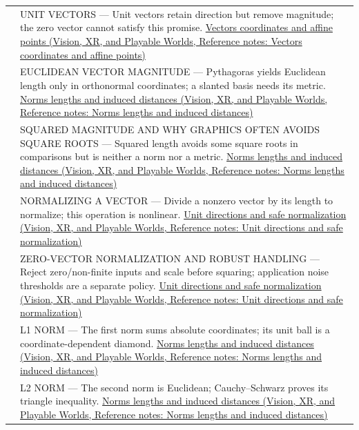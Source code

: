 {\begin{longtable}[]{@{}
  >{\raggedright\arraybackslash}p{}
  >{\raggedright\arraybackslash}p{}@{}}
525 & UNIT VECTORS --- Unit vectors retain direction but remove magnitude; the zero vector cannot satisfy this promise. \href{../07-Vision-XR-and-Playable-Worlds/main.pdf\#nameddest=appendix-0659864c0aa3}{Vectors coordinates and affine points (Vision, XR, and Playable Worlds, Reference notes: Vectors coordinates and affine points)} \\
526 & EUCLIDEAN VECTOR MAGNITUDE --- Pythagoras yields Euclidean length only in orthonormal coordinates; a slanted basis needs its metric. \href{../07-Vision-XR-and-Playable-Worlds/main.pdf\#nameddest=appendix-49933872bb51}{Norms lengths and induced distances (Vision, XR, and Playable Worlds, Reference notes: Norms lengths and induced distances)} \\
527 & SQUARED MAGNITUDE AND WHY GRAPHICS OFTEN AVOIDS SQUARE ROOTS --- Squared length avoids some square roots in comparisons but is neither a norm nor a metric. \href{../07-Vision-XR-and-Playable-Worlds/main.pdf\#nameddest=appendix-49933872bb51}{Norms lengths and induced distances (Vision, XR, and Playable Worlds, Reference notes: Norms lengths and induced distances)} \\
528 & NORMALIZING A VECTOR --- Divide a nonzero vector by its length to normalize; this operation is nonlinear. \href{../07-Vision-XR-and-Playable-Worlds/main.pdf\#nameddest=appendix-f744e41b95b4}{Unit directions and safe normalization (Vision, XR, and Playable Worlds, Reference notes: Unit directions and safe normalization)} \\
529 & ZERO-VECTOR NORMALIZATION AND ROBUST HANDLING --- Reject zero/non-finite inputs and scale before squaring; application noise thresholds are a separate policy. \href{../07-Vision-XR-and-Playable-Worlds/main.pdf\#nameddest=appendix-f744e41b95b4}{Unit directions and safe normalization (Vision, XR, and Playable Worlds, Reference notes: Unit directions and safe normalization)} \\
530 & L1 NORM --- The first norm sums absolute coordinates; its unit ball is a coordinate-dependent diamond. \href{../07-Vision-XR-and-Playable-Worlds/main.pdf\#nameddest=appendix-49933872bb51}{Norms lengths and induced distances (Vision, XR, and Playable Worlds, Reference notes: Norms lengths and induced distances)} \\
531 & L2 NORM --- The second norm is Euclidean; Cauchy--Schwarz proves its triangle inequality. \href{../07-Vision-XR-and-Playable-Worlds/main.pdf\#nameddest=appendix-49933872bb51}{Norms lengths and induced distances (Vision, XR, and Playable Worlds, Reference notes: Norms lengths and induced distances)} \\

\end{longtable}}
